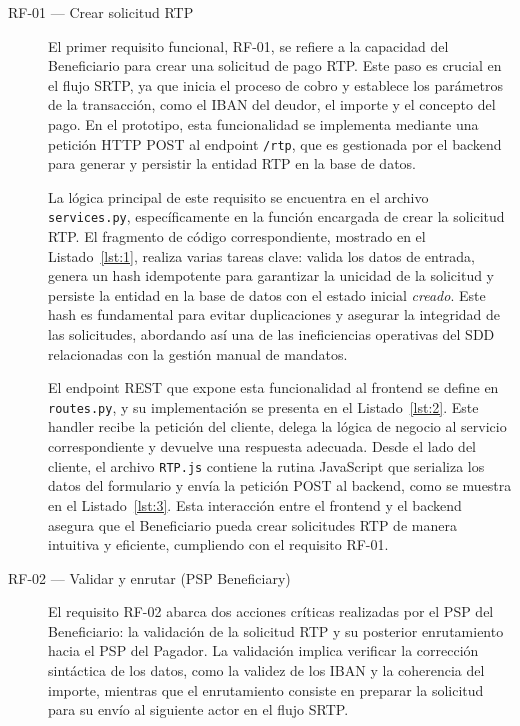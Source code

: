 \begin{description}
\item[RF-01 — Crear solicitud RTP]  
El primer requisito funcional, RF-01, se refiere a la capacidad del Beneficiario para crear una solicitud de pago RTP. Este paso es crucial en el flujo SRTP, ya que inicia el proceso de cobro y establece los parámetros de la transacción, como el IBAN del deudor, el importe y el concepto del pago. En el prototipo, esta funcionalidad se implementa mediante una petición HTTP POST al endpoint \texttt{/rtp}, que es gestionada por el backend para generar y persistir la entidad RTP en la base de datos.

La lógica principal de este requisito se encuentra en el archivo \texttt{services.py}, específicamente en la función encargada de crear la solicitud RTP. El fragmento de código correspondiente, mostrado en el Listado~\ref{lst:1}, realiza varias tareas clave: valida los datos de entrada, genera un hash idempotente para garantizar la unicidad de la solicitud y persiste la entidad en la base de datos con el estado inicial \textit{creado}. Este hash es fundamental para evitar duplicaciones y asegurar la integridad de las solicitudes, abordando así una de las ineficiencias operativas del SDD relacionadas con la gestión manual de mandatos.

El endpoint REST que expone esta funcionalidad al frontend se define en \texttt{routes.py}, y su implementación se presenta en el Listado~\ref{lst:2}. Este handler recibe la petición del cliente, delega la lógica de negocio al servicio correspondiente y devuelve una respuesta adecuada. Desde el lado del cliente, el archivo \texttt{RTP.js} contiene la rutina JavaScript que serializa los datos del formulario y envía la petición POST al backend, como se muestra en el Listado~\ref{lst:3}. Esta interacción entre el frontend y el backend asegura que el Beneficiario pueda crear solicitudes RTP de manera intuitiva y eficiente, cumpliendo con el requisito RF-01.

\item[RF-02 — Validar y enrutar (PSP Beneficiary)]  
El requisito RF-02 abarca dos acciones críticas realizadas por el PSP del Beneficiario: la validación de la solicitud RTP y su posterior enrutamiento hacia el PSP del Pagador. La validación implica verificar la corrección sintáctica de los datos, como la validez de los IBAN y la coherencia del importe, mientras que el enrutamiento consiste en preparar la solicitud para su envío al siguiente actor en el flujo SRTP.


\end{description}
